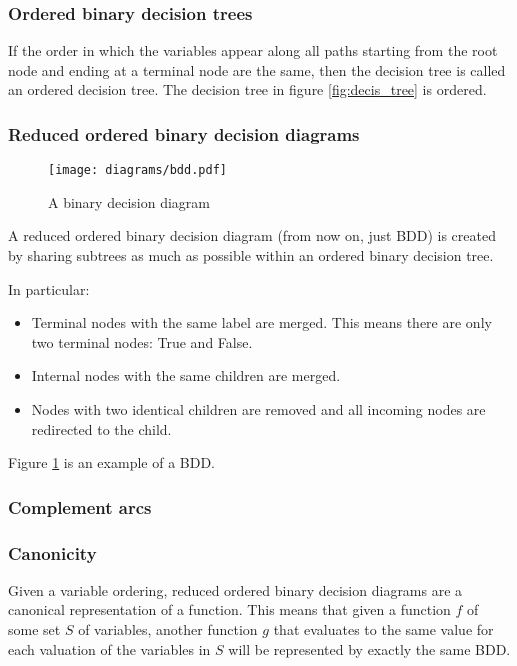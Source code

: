 \documentclass[a4paper,twoside,openright,11pt]{book}
\theoremstyle{definition}
\begin{document}
\subsubsection{Ordered binary decision trees}

If the order in which the variables appear along all paths starting from the root node and ending at a terminal node are the same, then the decision tree is called an ordered decision tree. The decision tree in figure \ref{fig:decis_tree} is ordered.

\subsubsection{Reduced ordered binary decision diagrams}

\begin{figure}[t]
\centering
\texttt{[image: diagrams/bdd.pdf]}
\caption{A binary decision diagram}
\label{fig:bdd}
\end{figure}

A reduced ordered binary decision diagram (from now on, just BDD) is created by sharing subtrees as much as possible within an ordered binary decision tree.

In particular: 
\begin{itemize}
    \item Terminal nodes with the same label are merged. This means there are only two terminal nodes: True and False.
    \item Internal nodes with the same children are merged.
    \item Nodes with two identical children are removed and all incoming nodes are redirected to the child.
\end{itemize}

Figure \ref{fig:bdd} is an example of a BDD.

\subsubsection{Complement arcs}

\subsubsection{Canonicity}
Given a variable ordering, reduced ordered binary decision diagrams are a canonical representation of a function. This means that given a function $f$ of some set $S$ of variables, another function $g$ that evaluates to the same value for each valuation of the variables in $S$ will be represented by exactly the same BDD.
\end{document}
